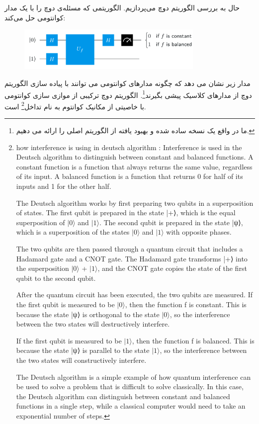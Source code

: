 \documentclass{book}
\begin{document}
حال به بررسی الگوریتم دوچ می‌پردازیم. الگوریتمی که مسئله‌ی دوچ را با یک مدار کوانتومی حل می‌کند:\\
\begin{center}
\begin{figure}[ht]
	\centering
	\includegraphics[width=0.8\textwidth]{Deutsch algorithm.png}
	\caption{}
\end{figure}
\end{center}


مدار زیر نشان می دهد که چگونه مدارهای کوانتومی می توانند با پیاده سازی الگوریتم دوچ از مدارهای کلاسیک پیشی بگیرند\footnote{ما در واقع یک نسخه ساده شده و بهبود یافته از الگوریتم اصلی را ارائه می دهیم.}. الگوریتم دوچ ترکیبی از موازی سازی کوانتومی با خاصیتی از مکانیک کوانتوم به نام تداخل\footnote{how interference is using in deutsch algorithm : Interference is used in the Deutsch algorithm to distinguish between constant and balanced functions. A constant function is a function that always returns the same value, regardless of its input. A balanced function is a function that returns 0 for half of its inputs and 1 for the other half.
	
	The Deutsch algorithm works by first preparing two qubits in a superposition of states. The first qubit is prepared in the state |+⟩, which is the equal superposition of $\vert 0 \rangle$ and $\vert 1 \rangle$. The second qubit is prepared in the state |ψ⟩, which is a superposition of the states $\vert 0 \rangle$ and $\vert 1 \rangle$ with opposite phases.
	
	The two qubits are then passed through a quantum circuit that includes a Hadamard gate and a CNOT gate. The Hadamard gate transforms |+⟩ into the superposition $\vert 0 \rangle$ + $\vert 1 \rangle$, and the CNOT gate copies the state of the first qubit to the second qubit.
	
	After the quantum circuit has been executed, the two qubits are measured. If the first qubit is measured to be $\vert 0 \rangle$, then the function f is constant. This is because the state |ψ⟩ is orthogonal to the state $\vert 0 \rangle$, so the interference between the two states will destructively interfere.
	
	If the first qubit is measured to be $\vert 1 \rangle$, then the function f is balanced. This is because the state |ψ⟩ is parallel to the state $\vert 1 \rangle$, so the interference between the two states will constructively interfere.
	
	The Deutsch algorithm is a simple example of how quantum interference can be used to solve a problem that is difficult to solve classically. In this case, the Deutsch algorithm can distinguish between constant and balanced functions in a single step, while a classical computer would need to take an exponential number of steps.} است.
\end{document}
